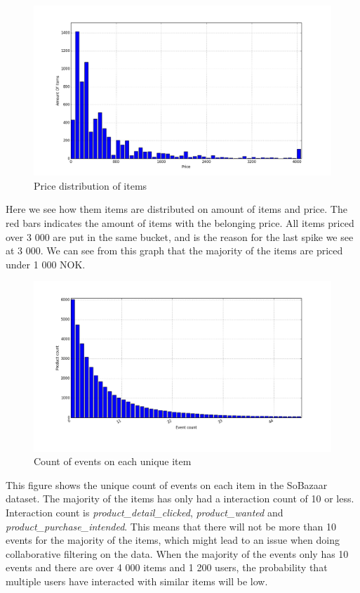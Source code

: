     \begin{figure}[H]
        \includegraphics[width=5in]{image/priceDistribution.png}
        \centering
        \caption{Price distribution of items}
    \label{figure:priceDistribution}
    \end{figure}
        Here we see how them items are distributed on amount of items and price. The red bars indicates the amount of items with the belonging price.
        All items priced over 3 000 are put in the same bucket, and is the reason for the last spike we see at 3 000.
        We can see from this graph that the majority of the items are priced under 1 000 NOK.

    \begin{figure}[H]
        \includegraphics[width=5in]{image/product_idcumdistribution.png}
        \centering
        \caption{Count of events on each unique item}
    \label{figure:eventOnProductDist}
    \end{figure}
        This figure shows the unique count of events on each item in the SoBazaar dataset.
        The majority of the items has only had a interaction count of 10 or less.
        Interaction count is \emph{product\_detail\_clicked}, \emph{product\_wanted} and \emph{product\_purchase\_intended}.
        This means that there will not be more than 10 events for the majority of the items, which might lead to an issue when doing collaborative filtering on the data.
        When the majority of the events only has 10 events and there are over 4 000 items and 1 200 users, the probability that multiple users have interacted with similar items will be low.

